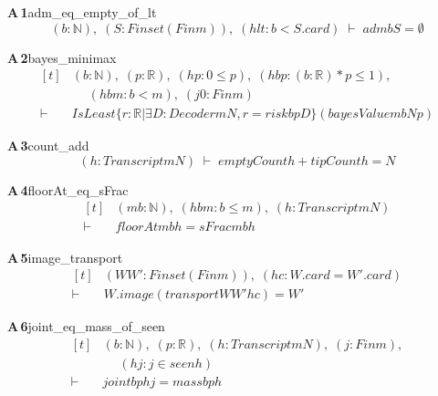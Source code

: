 \documentclass[conference]{IEEEtran}
\theoremstyle{definition}
\newcommand{\lean}[1]{\textsf{\footnotesize #1}}
\begin{document}
\noindent\textbf{A\,1}\quad\lean{adm\_eq\_empty\_of\_lt}
{\footnotesize\[ (\mathit{b} : \mathbb{N} ),\; (\mathit{S} : \mathit{Finset} (\mathit{Fin} \mathit{m})),\; (\mathit{hlt} : \mathit{b} < \mathit{S}.\mathit{card}) \;\vdash\; \mathit{adm} \mathit{b} \mathit{S} = \emptyset \]}

\noindent\textbf{A\,2}\quad\lean{bayes\_minimax}
{\footnotesize\[ \begin{aligned}[t]
&(\mathit{b} : \mathbb{N} ),\; (\mathit{p} : \mathbb{R} ),\; (\mathit{hp} : 0 \leq \mathit{p}),\; (\mathit{hbp} : (\mathit{b} : \mathbb{R} ) * \mathit{p} \leq 1),\\
&\quad \; (\mathit{hbm} : \mathit{b} < \mathit{m}),\; (\mathit{j0} : \mathit{Fin} \mathit{m})\\
\vdash\;&\mathit{IsLeast} \{ \mathit{r} : \mathbb{R} | \exists \mathit{D} : \mathit{Decoder} \mathit{m} \mathit{N}, \mathit{r} = \mathit{risk} \mathit{b} \mathit{p} \mathit{D}\} (\mathit{bayesValue} \mathit{m} \mathit{b} \mathit{N} \mathit{p})
\end{aligned} \]}

\noindent\textbf{A\,3}\quad\lean{count\_add}
{\footnotesize\[ (\mathit{h} : \mathit{Transcript} \mathit{m} \mathit{N}) \;\vdash\; \mathit{emptyCount} \mathit{h} + \mathit{tipCount} \mathit{h} = \mathit{N} \]}

\noindent\textbf{A\,4}\quad\lean{floorAt\_eq\_sFrac}
{\footnotesize\[ \begin{aligned}[t]
&(\mathit{m} \mathit{b} : \mathbb{N} ),\; (\mathit{hbm} : \mathit{b} \leq \mathit{m}),\; (\mathit{h} : \mathit{Transcript} \mathit{m} \mathit{N})\\
\vdash\;&\mathit{floorAt} \mathit{m} \mathit{b} \mathit{h} = \mathit{sFrac} \mathit{m} \mathit{b} \mathit{h}
\end{aligned} \]}

\noindent\textbf{A\,5}\quad\lean{image\_transport}
{\footnotesize\[ \begin{aligned}[t]
&(\mathit{W} \mathit{W'} : \mathit{Finset} (\mathit{Fin} \mathit{m})),\; (\mathit{hc} : \mathit{W}.\mathit{card} = \mathit{W'}.\mathit{card})\\
\vdash\;&\mathit{W}.\mathit{image} (\mathit{transport} \mathit{W} \mathit{W'} \mathit{hc}) = \mathit{W'}
\end{aligned} \]}

\noindent\textbf{A\,6}\quad\lean{joint\_eq\_mass\_of\_seen}
{\footnotesize\[ \begin{aligned}[t]
&(\mathit{b} : \mathbb{N} ),\; (\mathit{p} : \mathbb{R} ),\; (\mathit{h} : \mathit{Transcript} \mathit{m} \mathit{N}),\; (\mathit{j} : \mathit{Fin} \mathit{m}),\\
&\quad \; (\mathit{hj} : \mathit{j} \in \mathit{seen} \mathit{h})\\
\vdash\;&\mathit{joint} \mathit{b} \mathit{p} \mathit{h} \mathit{j} = \mathit{mass} \mathit{b} \mathit{p} \mathit{h}
\end{aligned} \]}
\end{document}
